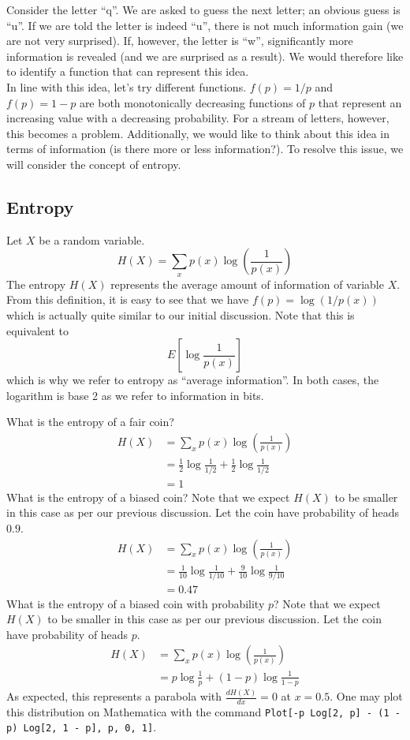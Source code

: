 \documentclass[11pt]{article}
\theoremstyle{definition}
\begin{document}
\example[Motivation] Consider the letter ``q''. We are asked to guess the next letter; an obvious guess is ``u''. If we are told the letter is indeed ``u'', there is not much information gain (we are not very surprised). If, however, the letter is ``w'', significantly more information is revealed (and we are surprised as a result). We would therefore like to identify a function that can represent this idea. \\

\noindent In line with this idea, let's try different functions. $f(p) = 1/p$ and $f(p) = 1-p$ are both monotonically decreasing functions of $p$ that represent an increasing value with a decreasing probability. For a stream of letters, however, this becomes a problem. Additionally, we would like to think about this idea in terms of information (is there more or less information?). To resolve this issue, we will consider the concept of entropy.

\subsection{Entropy}

 Let $X$ be a random variable. $$H(X) = \sum_x p(x) \log \left( \frac{1}{p(x)} \right)$$ The entropy $H(X)$ represents the average amount of information of variable $X$. From this definition, it is easy to see that we have $f(p) = \log (1/p(x))$ which is actually quite similar to our initial discussion. Note that this is equivalent to $$E \left[ \log \frac{1}{p(x)} \right]$$which is why we refer to entropy as ``average information''. In both cases, the logarithm is base 2 as we refer to information in bits. 

\example What is the entropy of a fair coin?
\begin{align*}
H(X) &= \sum_x p(x) \log \left( \frac{1}{p(x)} \right) \\
&= \frac{1}{2} \log \frac{1}{1/2} + \frac{1}{2} \log \frac{1}{1/2} \\
&= 1
\end{align*}
\example What is the entropy of a biased coin? Note that we expect $H(X)$ to be smaller in this case as per our previous discussion. Let the coin have probability of heads $0.9$. 
\begin{align*}
H(X) &= \sum_x p(x) \log \left( \frac{1}{p(x)} \right) \\
&= \frac{1}{10} \log \frac{1}{1/10} + \frac{9}{10} \log \frac{1}{9/10} \\
&= 0.47
\end{align*}
\example What is the entropy of a biased coin with probability $p$? Note that we expect $H(X)$ to be smaller in this case as per our previous discussion. Let the coin have probability of heads $p$. 
\begin{align*}
H(X) &= \sum_x p(x) \log \left( \frac{1}{p(x)} \right) \\
&= p \log \frac{1}{p} + (1-p) \log \frac{1}{1-p} 
\end{align*}
As expected, this represents a parabola with $\frac{d H(X)}{dx} = 0$ at $x = 0.5$. One may plot this distribution on Mathematica with the command \texttt{Plot[-p Log[2, p] - (1 - p) Log[2, 1 - p], {p, 0, 1}]}.
\end{document}
